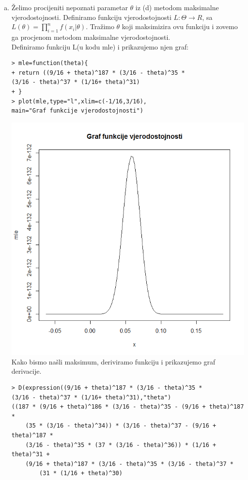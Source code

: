 \documentclass[11pt]{article}
\begin{document}
\begin{enumerate}[(a)]
\item Želimo procijeniti nepoznati parametar $\theta$ iz (d) metodom maksimalne
vjerodostojnosti. Definiramo funkciju vjerodostojnosti $L:\Theta \rightarrow R$, sa $L(\theta)=\prod_{i=1}^{n} f(x_{i}|\theta)$. Tražimo $\theta$ koji maksimizira ovu funkciju i zovemo ga procjenom metodom maksimalne vjerodostojnosti.\\
Definiramo funkciju L(u kodu mle) i prikazujemo njen graf:
\begin{verbatim}
> mle=function(theta){
+ return ((9/16 + theta)^187 * (3/16 - theta)^35 *
(3/16 - theta)^37 * (1/16+ theta)^31)
+ }
> plot(mle,type="l",xlim=c(-1/16,3/16),
main="Graf funkcije vjerodostojnosti")
\end{verbatim}
\includegraphics[scale=0.4]{45.png}\\
Kako bismo našli maksimum, deriviramo funkciju i prikazujemo graf derivacije.
\begin{verbatim}
> D(expression((9/16 + theta)^187 * (3/16 - theta)^35 *
(3/16 - theta)^37 * (1/16+ theta)^31),"theta")
((187 * (9/16 + theta)^186 * (3/16 - theta)^35 - (9/16 + theta)^187 * 
    (35 * (3/16 - theta)^34)) * (3/16 - theta)^37 - (9/16 + theta)^187 * 
    (3/16 - theta)^35 * (37 * (3/16 - theta)^36)) * (1/16 + theta)^31 + 
    (9/16 + theta)^187 * (3/16 - theta)^35 * (3/16 - theta)^37 * 
        (31 * (1/16 + theta)^30)

\end{verbatim}
\end{enumerate}
\end{document}
